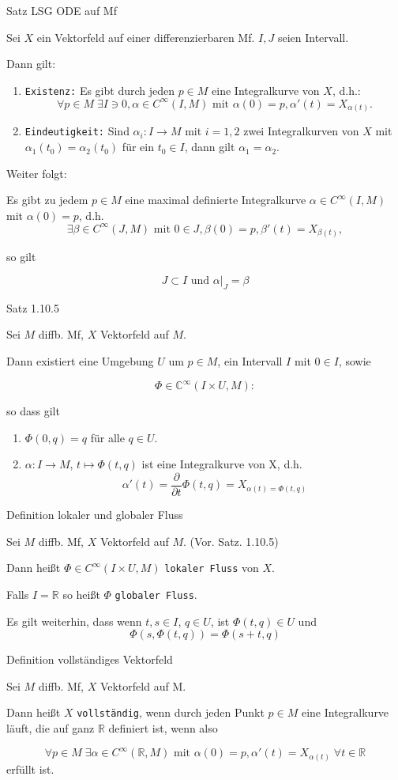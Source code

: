 \documentclass[a6paper,11pt,grid=front]{kartei}
\newcommand{\fl}[1]{\begin{flushleft}
 #1 \end{flushleft}}
\newcommand{\R}{\mathbb{R}}
\newcommand{\C}{\mathbb{C}}
\newcounter{def}
\begin{document}
\nonameyet
{Satz} {LSG ODE auf Mf}
{
\small
Sei $X$ ein Vektorfeld auf einer differenzierbaren Mf. $I,J$ seien Intervall.
\fl{Dann gilt:}
\begin{enumerate}[1.]
\item \texttt{Existenz:} Es gibt durch jeden $p\in M$ eine Integralkurve von $X$, d.h.: 
\[
\forall p\in M \; \exists I \ni 0, \alpha \in C^\infty(I,M) \text{ mit }
\alpha(0) = p, \alpha'(t) = X_{\alpha(t)}.
\]
%
\item \texttt{Eindeutigkeit:} Sind $\alpha_i : I \to M$ mit $i = 1,2$ 
zwei Integralkurven von $X$ mit $\alpha_1(t_0) = \alpha_2(t_0)$ für 
ein $t_0 \in I$, dann gilt $\alpha_1 = \alpha_2$.
\end{enumerate}
\fl{Weiter folgt:}
\vspace{-1em}
Es gibt zu jedem $p\in M$ eine maximal definierte Integralkurve 
$\alpha \in C^\infty(I,M)$ mit $\alpha(0) = p$, d.h.
\[
\exists \beta \in C^\infty(J, M) \text{ mit } 
0\in J, \beta(0) = p, \beta'(t) = X_{\beta(t)},
\]
\fl{so gilt}
\[
J \subset I \text{ und } \alpha|_J = \beta
\]
}
{}

\nonameyet
{Satz 1.10.5} {}
{
\small 
Sei $M$ diffb. Mf, $X$ Vektorfeld auf $M$. 
\fl{Dann existiert eine Umgebung $U$ um $p \in M$, ein Intervall $I$ 
mit $0\in I$, sowie}
\[
\Phi\in \C^\infty(I\times U, M): 
\]
\fl{so dass gilt}
\begin{enumerate}[1.]
\item $\Phi(0,q) = q$ für alle $q\in U$.
\item $\alpha : I \to M$, $t \mapsto \Phi(t,q)$ ist eine Integralkurve von X,
d.h.
\[
\alpha'(t) = \frac{\partial}{\partial t} \Phi(t,q) = X_{\alpha(t) = \Phi(t,q)}
\]
\end{enumerate}
}
{}

\nonameyet
{Definition} {lokaler und globaler Fluss}
{
Sei $M$ diffb. Mf, $X$ Vektorfeld auf $M$. (Vor. Satz. 1.10.5) 
\fl{Dann heißt $\Phi\in C^\infty(I\times U, M)$ \texttt{lokaler Fluss}
von $X$.}
\fl{Falls $I = \R$ so heißt $\Phi$ \texttt{globaler Fluss}.}
\small
Es gilt weiterhin, dass wenn $t,s \in I$, $q\in U$, ist $\Phi(t,q) \in U$ und 
\[
\Phi(s, \Phi(t,q)) = \Phi(s + t, q)
\]
}
{}

\nonameyet
{Definition} {\small vollständiges Vektorfeld}
{
Sei $M$ diffb. Mf, $X$ Vektorfeld auf M.
\fl{Dann heißt $X$ \texttt{vollständig}, wenn durch jeden Punkt $p\in M$
eine Integralkurve läuft, die auf ganz $\R$ definiert ist, wenn also}
\[
\forall p\in M \; \exists \alpha \in C^\infty(\R,M) 
\text{ mit } \alpha(0) = p, \alpha'(t) = X_{\alpha(t)} \; \forall t\in\R
\]
erfüllt ist.
}
{}
\end{document}
